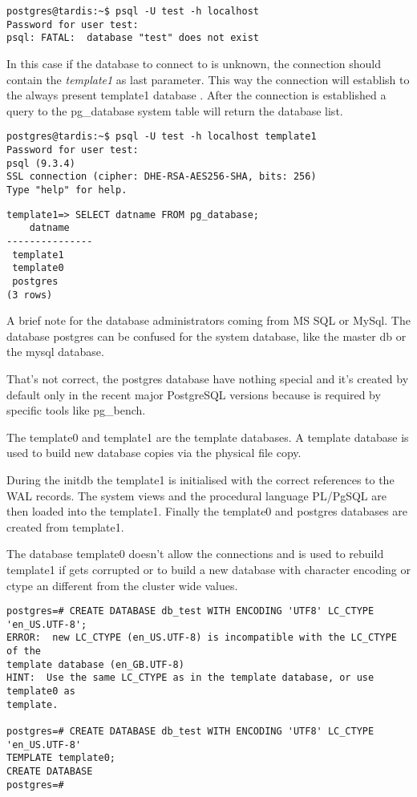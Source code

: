 \begin{verbatim}
postgres@tardis:~$ psql -U test -h localhost
Password for user test: 
psql: FATAL:  database "test" does not exist
\end{verbatim}

In this case if the database to connect to is unknown, the connection should 
contain the \textit{template1} as last parameter. This way the connection will 
establish to the always present template1 database . 
After the connection is 
established a query to the pg\_database system table will return the database 
list.

\begin{verbatim}
postgres@tardis:~$ psql -U test -h localhost template1
Password for user test: 
psql (9.3.4)
SSL connection (cipher: DHE-RSA-AES256-SHA, bits: 256)
Type "help" for help.
\end{verbatim}
\begin{lstlisting}[style=pgsql]
template1=> SELECT datname FROM pg_database;
    datname    
---------------
 template1
 template0
 postgres
(3 rows)

\end{lstlisting}

A brief note for the database administrators coming from MS SQL or MySql.
The database postgres can be confused for the system database, like the master 
db or the mysql database. 

That's not correct, the postgres database have nothing 
special and it's created by default only in the recent major PostgreSQL 
versions because is required by specific tools like pg\_bench.

The template0 and template1   are the template databases. A template database  is used to build new database copies via the physical file copy. 

During the initdb the template1 is initialised with the correct references to 
the WAL records. The system views and the procedural language PL/PgSQL are then
loaded into the template1. Finally the template0 and postgres databases are 
created from template1.

The database template0 doesn't allow the connections and is used to rebuild 
template1 if gets corrupted or to build a new database with 
character encoding or ctype an different from the cluster wide values. 

\begin{lstlisting}[style=pgsql]
postgres=# CREATE DATABASE db_test WITH ENCODING 'UTF8' LC_CTYPE 'en_US.UTF-8';
ERROR:  new LC_CTYPE (en_US.UTF-8) is incompatible with the LC_CTYPE of the 
template database (en_GB.UTF-8)
HINT:  Use the same LC_CTYPE as in the template database, or use template0 as 
template.

postgres=# CREATE DATABASE db_test WITH ENCODING 'UTF8' LC_CTYPE 'en_US.UTF-8' 
TEMPLATE template0;
CREATE DATABASE
postgres=# 

\end{lstlisting}

